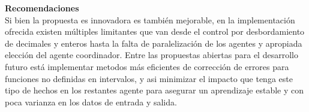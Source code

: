 \textbf{ \Huge Recomendaciones} \\
    
    Si bien la propuesta es innovadora es también mejorable, en la implementación ofrecida existen múltiples limitantes que van desde el control por desbordamiento 
    de decimales y enteros hasta la falta de paralelización de los agentes y apropiada elección del agente coordinador. Entre las propuestas abiertas para el desarrollo 
    futuro está implementar metodos más eficientes de corrección de errores para funciones no definidas en intervalos, y asi minimizar el impacto que tenga este tipo de 
    hechos en los restantes agente para asegurar un aprendizaje estable y con poca varianza en los datos de entrada y salida.

